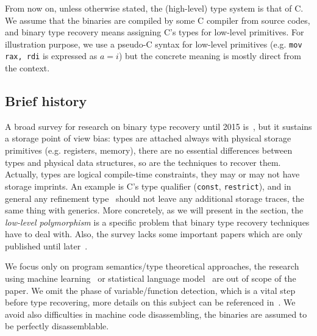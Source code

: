\documentclass[compsoc,conference,a4paper,10pt,times]{IEEEtran}
\begin{document}
From now on, unless otherwise stated, the (high-level) type system is that of C. We assume that the binaries are
compiled by some C compiler from source codes, and binary type recovery means assigning C's types for
low-level primitives. For illustration purpose, we use a pseudo-C syntax for low-level primitives
(e.g. \texttt{\small mov rax, rdi} is expressed as $a = i$) but the concrete meaning is mostly direct from the context.

\subsection{Brief history}
\noindent
A broad survey for research on binary type recovery until 2015 is~\cite{caballero_type_2016}, but it sustains a storage point of view bias: types are attached
always with physical storage primitives (e.g. registers, memory), there are no essential differences 
between types and physical data structures, so are the techniques to recover them. Actually, types are 
logical compile-time constraints, they may or may not have storage imprints. An example is C's 
type qualifier (\texttt{\small const}, \texttt{\small restrict}), and in general any
refinement type~\cite{freeman_refinement_1991} should not leave any additional storage traces, the same thing with generics. More concretely, as
we will present in the section, the \emph{low-level polymorphism} is a specific problem that binary type
recovery techniques have to deal with.
Also, the survey lacks some important
papers which are only published until later~\cite{noonan_polymorphic_2016,robbins_minx_2016}.

We focus only on program semantics/type theoretical approaches, the research using machine learning~\cite{maier_typeminer_2019}
or statistical language model~\cite{katz_estimating_2016} are out of scope of the paper.
We omit the phase of variable/function detection, which is a vital step before
type recovering, more details on this subject can be referenced in~\cite{balakrishnan_divine_2007}.
We avoid also difficulties in machine code disassembling, the binaries are assumed to be perfectly disassemblable.

\end{document}
